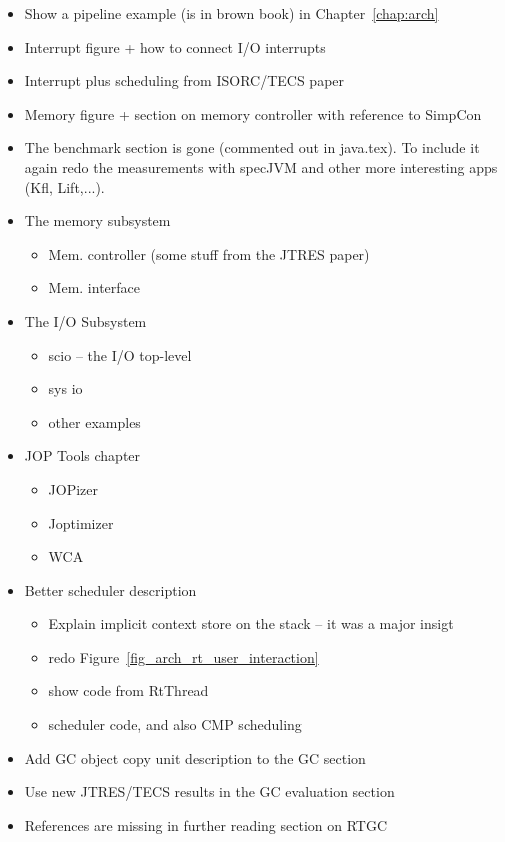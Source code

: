 \begin{itemize}
  \item Show a pipeline example (is in brown book) in
      Chapter~\ref{chap:arch}
  \item Interrupt figure + how to connect I/O interrupts
  \item Interrupt plus scheduling from ISORC/TECS paper
  \item Memory figure + section on memory controller with
      reference to SimpCon
  \item The benchmark section is gone (commented out in
      java.tex). To include it again redo the measurements with
      specJVM and other more interesting apps (Kfl, Lift,...).
  \item The memory subsystem
  \begin{itemize}
    \item Mem. controller (some stuff from the JTRES paper)
    \item Mem. interface
  \end{itemize}
  \item The I/O Subsystem
  \begin{itemize}
    \item scio -- the I/O top-level
    \item sys io
    \item other examples
  \end{itemize}
  \item JOP Tools chapter
  \begin{itemize}
    \item JOPizer
    \item Joptimizer
    \item WCA
  \end{itemize}
  \item Better scheduler description
\begin{itemize}
  \item Explain implicit context store on the stack -- it was
      a major insigt
  \item redo Figure~\ref{fig_arch_rt_user_interaction}
  \item show code from RtThread
  \item scheduler code, and also CMP scheduling
\end{itemize}
  \item Add GC object copy unit description to the GC section
  \item Use new JTRES/TECS results in the GC evaluation section
  \item References are missing in further reading section on RTGC

\end{itemize}
